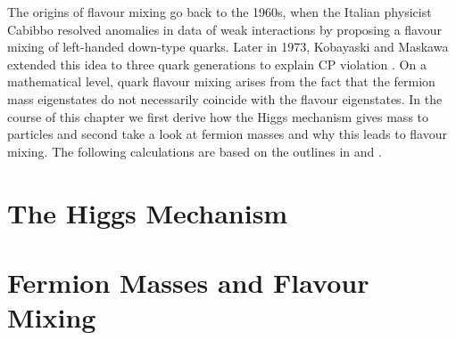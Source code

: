 The origins of flavour mixing go back to the 1960s, when the Italian physicist Cabibbo resolved anomalies in data of weak interactions by proposing a flavour mixing of left-handed down-type quarks. Later in 1973, Kobayaski and Maskawa extended this idea to three quark generations to explain CP violation \cite{Griffiths}. On a mathematical level, quark flavour mixing arises from the fact that the fermion mass eigenstates do not necessarily coincide with the flavour eigenstates. In the course of this chapter we first derive how the Higgs mechanism gives mass to particles and second take a look at fermion masses and why this leads to flavour mixing. The following calculations are based on the outlines in \cite[Chapter 20]{Peskin} and \cite[Chapter 1.2.1]{Tevatron}.
\section{The Higgs Mechanism}

\section{Fermion Masses and Flavour Mixing}
